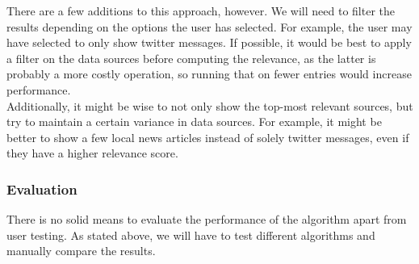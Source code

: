 There are a few additions to this approach, however.
We will need to filter the results depending on the options the user has selected.
For example, the user may have selected to only show twitter messages.
If possible, it would be best to apply a filter on the data sources before computing the relevance, as the latter is probably a more costly operation, so running that on fewer entries would increase performance. \\
Additionally, it might be wise to not only show the top-most relevant sources, but try to maintain a certain variance in data sources.
For example, it might be better to show a few local news articles instead of solely twitter messages, even if they have a higher relevance score.



\subsubsection*{Evaluation}
There is no solid means to evaluate the performance of the algorithm apart from user testing.
As stated above, we will have to test different algorithms and manually compare the results.